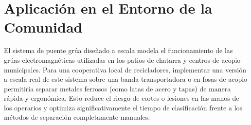 \section{Aplicación en el Entorno de la Comunidad}
El sistema de puente grúa diseñado a escala modela el funcionamiento de las grúas electromagnéticas utilizadas en los patios de chatarra y centros de acopio municipales. Para una cooperativa local de recicladores, implementar una versión a escala real de este sistema sobre una banda transportadora o en fosas de acopio permitiría separar metales ferrosos (como latas de acero y tapas) de manera rápida y ergonómica. Esto reduce el riesgo de cortes o lesiones en las manos de los operarios y optimiza significativamente el tiempo de clasificación frente a los métodos de separación completamente manuales.
